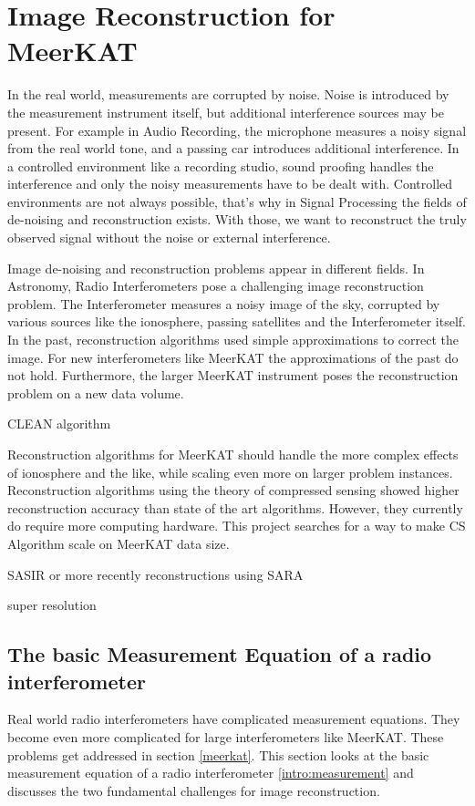 \section{Image Reconstruction for MeerKAT} \label{intro}
In the real world, measurements are corrupted by noise. Noise is introduced by the measurement instrument itself, but additional interference sources may be present. For example in Audio Recording, the microphone measures a noisy signal from the real world tone, and a passing car introduces additional interference. In a controlled environment like a recording studio, sound proofing handles the interference and only the noisy measurements have to be dealt with. Controlled environments are not always possible, that's why in Signal Processing the fields of de-noising and reconstruction exists. With those, we want to reconstruct the truly observed signal without the noise or external interference.

Image de-noising and reconstruction problems appear in different fields. In Astronomy, Radio Interferometers pose a challenging image reconstruction problem. The Interferometer measures a noisy image of the sky, corrupted by various sources like the ionosphere, passing satellites and the Interferometer itself. In the past, reconstruction algorithms used simple approximations to correct the image. For new interferometers like MeerKAT the approximations of the past do not hold. Furthermore, the larger MeerKAT instrument poses the reconstruction problem on a new data volume. 

CLEAN algorithm\cite{rich2008multi}\cite{rau2011multi}

Reconstruction algorithms for MeerKAT should handle the more complex effects of ionosphere and the like, while scaling even more on larger problem instances. Reconstruction algorithms using the theory of compressed sensing\cite{candes2006robust}\cite{donoho2006compressed} showed higher reconstruction accuracy than state of the art algorithms. However, they currently do require more computing hardware. This project searches for a way to make CS Algorithm scale on MeerKAT data size.

SASIR\cite{starck2015starlet} or more recently reconstructions using SARA \cite{dabbech2018cygnus} \cite{birdi2018sparse}

super resolution

\subsection{The basic Measurement Equation of a radio interferometer}
Real world radio interferometers have complicated measurement equations. They become even more complicated for large interferometers like MeerKAT. These problems get addressed in section \ref{meerkat}. This section looks at the basic measurement equation of a radio interferometer \eqref{intro:measurement} and discusses the two fundamental challenges for image reconstruction. 

